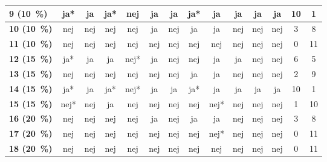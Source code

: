 \begin{longtable} {l|c|c|c|c|c|c|c|c|c|c|c|c|c}
\cellcolor[HTML]{C0C0C0}\textbf{9    (10~\%)}	& ja* 	& ja  &	ja*  & \cellcolor[HTML]{D4EED3}nej   & ja  & ja  &ja*   &ja &ja &ja &ja & \cellcolor[HTML]{EFEFEF}10 & \cellcolor[HTML]{EFEFEF}1 \\ \hline
\cellcolor[HTML]{C0C0C0}\textbf{10 (10~\%)}	&nej &nej &nej&	nej	&ja	&nej&	ja&	ja&	nej&	nej&nej & \cellcolor[HTML]{EFEFEF}3 & \cellcolor[HTML]{EFEFEF}8 \\ \hline
\cellcolor[HTML]{C0C0C0}\textbf{11   (10~\%)}	 & \cellcolor[HTML]{ECF4FF} nej	& \cellcolor[HTML]{ECF4FF}nej &	\cellcolor[HTML]{ECF4FF}nej &\cellcolor[HTML]{ECF4FF} nej	& \cellcolor[HTML]{ECF4FF}nej &	\cellcolor[HTML]{ECF4FF}nej	& \cellcolor[HTML]{ECF4FF}nej & \cellcolor[HTML]{ECF4FF}nej	& \cellcolor[HTML]{ECF4FF}nej	& \cellcolor[HTML]{ECF4FF}nej	& \cellcolor[HTML]{ECF4FF}nej & \cellcolor[HTML]{EFEFEF}0 & \cellcolor[HTML]{EFEFEF}11\\ \hline 
\cellcolor[HTML]{C0C0C0}\textbf{12 (15~\%)}	&ja*&	ja&	ja&	nej*&	ja&	nej&	nej&	ja&	ja&	nej&	nej & \cellcolor[HTML]{EFEFEF}6 & \cellcolor[HTML]{EFEFEF}5 \\ \hline
\cellcolor[HTML]{C0C0C0}\textbf{13 (15~\%)}	&nej&	nej&	nej&	nej&	nej&	nej& 	ja&	ja&	nej&	nej&	nej & \cellcolor[HTML]{EFEFEF}2 & \cellcolor[HTML]{EFEFEF}9\\ \hline
\cellcolor[HTML]{C0C0C0}\textbf{14 (15~\%)}&ja*&	ja&	ja*& \cellcolor[HTML]{D4EED3}nej*&	ja&	ja&	ja*&	ja&	ja&	ja&	ja &\cellcolor[HTML]{EFEFEF}10 &\cellcolor[HTML]{EFEFEF}1
\\ \hline
\cellcolor[HTML]{C0C0C0}\textbf{15 (15~\%)}	& nej* & nej & \cellcolor[HTML]{D4EED3}ja & nej & nej & nej &	nej & nej* & nej & nej & nej & \cellcolor[HTML]{EFEFEF}1 & \cellcolor[HTML]{EFEFEF}10 \\ \hline
\cellcolor[HTML]{C0C0C0}\textbf{16 (20~\%)}	& nej & nej & nej & nej & ja & nej & ja & ja & nej & nej & nej & \cellcolor[HTML]{EFEFEF}3 & \cellcolor[HTML]{EFEFEF}8 \\ \hline
\cellcolor[HTML]{C0C0C0}\textbf{17 (20~\%)} & \cellcolor[HTML]{ECF4FF} nej	& \cellcolor[HTML]{ECF4FF}nej &	\cellcolor[HTML]{ECF4FF}nej &\cellcolor[HTML]{ECF4FF} nej	& \cellcolor[HTML]{ECF4FF}nej &	\cellcolor[HTML]{ECF4FF}nej	& \cellcolor[HTML]{ECF4FF}nej & \cellcolor[HTML]{ECF4FF}nej*	& \cellcolor[HTML]{ECF4FF}nej	& \cellcolor[HTML]{ECF4FF}nej	& \cellcolor[HTML]{ECF4FF}nej & \cellcolor[HTML]{EFEFEF}0 & \cellcolor[HTML]{EFEFEF}11\\ \hline 
\cellcolor[HTML]{C0C0C0}\textbf{18 (20~\%)}	 & \cellcolor[HTML]{ECF4FF} nej	& \cellcolor[HTML]{ECF4FF}nej &	\cellcolor[HTML]{ECF4FF}nej &\cellcolor[HTML]{ECF4FF} nej	& \cellcolor[HTML]{ECF4FF}nej &	\cellcolor[HTML]{ECF4FF}nej	& \cellcolor[HTML]{ECF4FF}nej & \cellcolor[HTML]{ECF4FF}nej	& \cellcolor[HTML]{ECF4FF}nej	& \cellcolor[HTML]{ECF4FF}nej	& \cellcolor[HTML]{ECF4FF}nej & \cellcolor[HTML]{EFEFEF}0 & \cellcolor[HTML]{EFEFEF}11\\ \hline 

\end{longtable}
